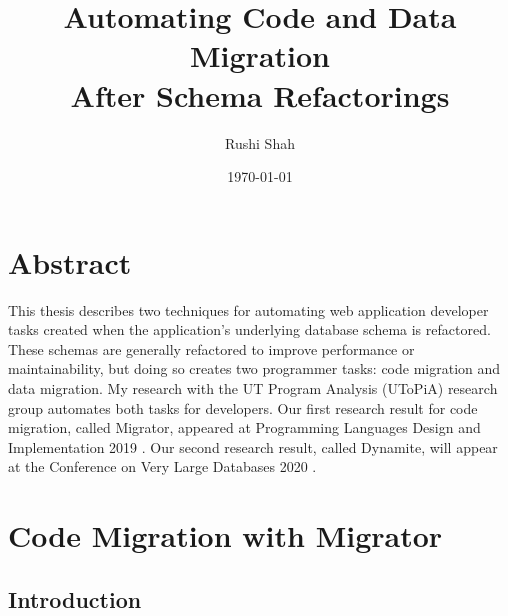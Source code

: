 \documentclass[]{article}
\author{Rushi Shah}
\date{\today}
\title{Automating Code and Data Migration \\ After Schema Refactorings}
\begin{document}
    \maketitle

    \section{Abstract}

        This thesis describes two techniques for automating web application developer tasks created when the application's underlying database schema is refactored. These schemas are generally refactored to improve performance or maintainability, but doing so creates two programmer tasks: code migration and data migration. My research with the UT Program Analysis (UToPiA) research group automates both tasks for developers. Our first research result for code migration, called Migrator, appeared at Programming Languages Design and Implementation 2019 \cite{pldi19}. Our second research result, called Dynamite, will appear at the Conference on Very Large Databases 2020 \cite{vldb20}.







    \section{Code Migration with Migrator}

        \subsection{Introduction}
\end{document}
